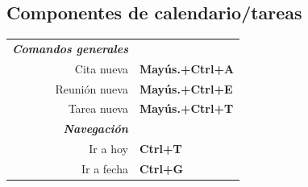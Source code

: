 \documentclass[12pt]{article}
\begin{document}
\begin{landscape}
\begin{center}
\begin{multicols}{2}
	\section*{Componentes de calendario/tareas}
	\begin{tabular*}{4in}{rp{1.5in}}
		\textit{\textbf{Comandos generales}}	&					\\
		Cita nueva				& \textbf{Mayús.+Ctrl+A}		\\
		Reunión nueva				& \textbf{Mayús.+Ctrl+E}		\\
		\vspace{1.5mm}
		Tarea nueva				& \textbf{Mayús.+Ctrl+T}		\\
		\textit{\textbf{Navegación}}		&					\\
		Ir a hoy				& \textbf{Ctrl+T}			\\
		Ir a fecha				& \textbf{Ctrl+G}			\\
	\end{tabular*}
	\end{multicols}
	\end{center}
   \end{landscape}
 
\end{document}
